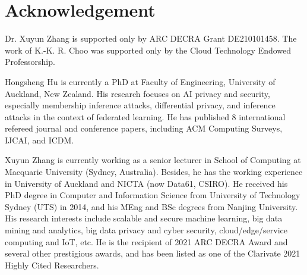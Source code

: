 \documentclass[10pt,journal,compsoc]{IEEEtran}
\begin{document}
\section*{Acknowledgement}
Dr. Xuyun Zhang is supported only by ARC DECRA Grant DE210101458. The work of K.-K. R. Choo was supported only by the Cloud Technology Endowed Professorship.

\ifCLASSOPTIONcaptionsoff
  \newpage
\fi






\begin{IEEEbiography}{Hongsheng Hu}
is currently a PhD at Faculty of Engineering, University of Auckland, New Zealand. His research focuses on AI privacy and security, especially membership inference attacks, differential privacy, and inference attacks in the context of federated learning. He has published 8 international refereed journal and conference papers, including ACM Computing Surveys, IJCAI, and ICDM.
\end{IEEEbiography}

\begin{IEEEbiography}{Xuyun Zhang}
is currently working as a senior lecturer in School of Computing at Macquarie University (Sydney, Australia). Besides, he has the working experience in University of Auckland and NICTA (now Data61, CSIRO). He received his PhD degree in Computer and Information Science from University of Technology Sydney (UTS) in 2014, and his MEng and BSc degrees from Nanjing University. His research interests include scalable and secure machine learning, big data mining and analytics, big data privacy and cyber security, cloud/edge/service computing and IoT, etc. He is the recipient of 2021 ARC DECRA Award and several other prestigious awards, and has been listed as one of the Clarivate 2021 Highly Cited Researchers.
\end{IEEEbiography}
\end{document}
